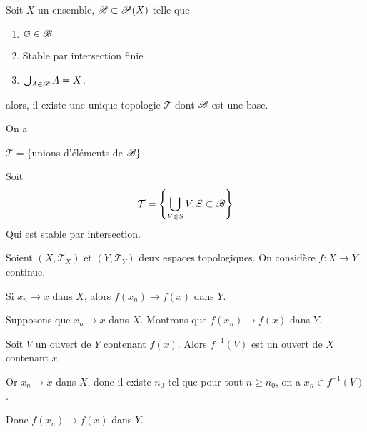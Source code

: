 \documentclass[french,a4paper,10pt]{article}
\begin{document}
			\begin{proposition}
				Soit $X$ un ensemble, $\mathscr{B}\subset\mathscr{P}(X)$ telle que
					\begin{enumerate}[label=$(\roman*)$]
						\item $\varnothing\in\mathscr{B}$
						
						\item Stable par intersection finie
						
						\item $\bigcup_{A\in \mathscr{B}}A=X$.
					\end{enumerate}
				alors, il existe une unique topologie $\mathcal T$ dont $\mathscr{B}$ est une base.
			\end{proposition}
			\begin{myproof}
				On a
					\begin{center}
						$\mathcal T=\{$unions d'éléments de $\mathscr{B}\}$
					\end{center}
				Soit
					\[\begin{aligned}
						\mathcal T = \left\{\bigcup_{V\in S}V,S\subset \mathscr{B}\right\}
					\end{aligned}\]
				Qui est stable par intersection.
			\end{myproof}

			\medskip

			Soient $(X,\mathcal T_X)$ et $(Y,\mathcal T_Y)$ deux espaces topologiques. On considère $f\colon X\to Y$ continue.

			\begin{proposition}
				Si $x_n\to x$ dans $X$, alors $f(x_n)\to f(x)$ dans $Y$.
			\end{proposition}

			\begin{myproof}
				Supposons que $x_n\to x$ dans $X$. 
				Montrons que $f(x_n)\to f(x)$ dans $Y$.

				Soit $V$ un ouvert de $Y$ contenant $f(x)$. Alors $f^{-1}(V)$ est un ouvert de $X$ contenant $x$.

				Or $x_n\to x$ dans $X$, donc il existe $n_0$ tel que pour tout $n\ge n_0$, on a $x_n\in f^{-1}(V)$.

				Donc $f(x_n)\to f(x)$ dans $Y$.
			\end{myproof}
\end{document}
